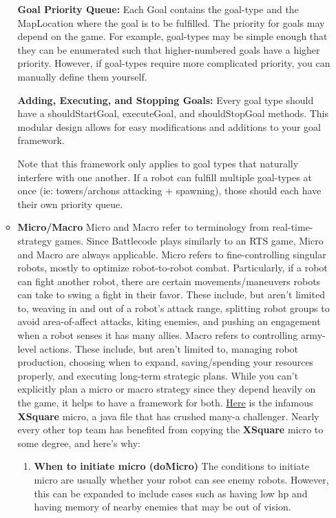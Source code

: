 \begin{enumerate}
\begin{itemize}
      \textbf{Goal Priority Queue: } Each Goal contains the goal-type and the MapLocation where the goal is to be fulfilled. The priority for goals may depend on the game. For example, goal-types may be simple enough that they can be enumerated such that higher-numbered goals have a higher priority. However, if goal-types require more complicated priority, you can manually define them yourself.

    \medskip

      \textbf{Adding, Executing, and Stopping Goals:} Every goal type should have a shouldStartGoal, executeGoal, and shouldStopGoal methods. This modular design allows for easy modifications and additions to your goal framework.

    \medskip

      Note that this framework only applies to goal types that naturally interfere with one another. If a robot can fulfill multiple goal-types at once (ie: towers/archons attacking + spawning), those should each have their own priority queue.
      \item \textbf{Micro/Macro} Micro and Macro refer to terminology from real-time-strategy games. Since Battlecode plays similarly to an RTS game, Micro and Macro are always applicable. Micro refers to fine-controlling singular robots, mostly to optimize robot-to-robot combat. Particularly, if a robot can fight another robot, there are certain movements/maneuvers robots can take to swing a fight in their favor. These include, but aren't limited to, weaving in and out of a robot's attack range, splitting robot groups to avoid area-of-affect attacks, kiting enemies, and pushing an engagement when a robot senses it has many allies. Macro refers to controlling army-level actions. These include, but aren't limited to, managing robot production, choosing when to expand, saving/spending your resources properly, and executing long-term strategic plans. While you can't explicitly plan a micro or macro strategy since they depend heavily on the game, it helps to have a framework for both. \href{https://github.com/IvanGeffner/BTC24/blob/master/MicroManager.java}{Here} is the infamous \textbf{XSquare} micro, a java file that has crushed many-a challenger. Nearly every other top team has benefited from copying the \textbf{XSquare} micro to some degree, and here's why:
      \begin{enumerate}
          \item \textbf{When to initiate micro (doMicro)} The conditions to initiate micro are usually whether your robot can see enemy robots. However, this can be expanded to include cases such as having low hp and having memory of nearby enemies that may be out of vision.

\end{enumerate}
\end{itemize}
\end{enumerate}
